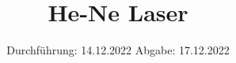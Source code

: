 

\subject{VERSUCH 61}
\title{He-Ne Laser}
\date{%
  Durchführung: 14.12.2022
  \hspace{3em}
  Abgabe: 17.12.2022
}



\maketitle
\thispagestyle{empty}
\tableofcontents
\newpage





\newpage


\printbibliography{}


